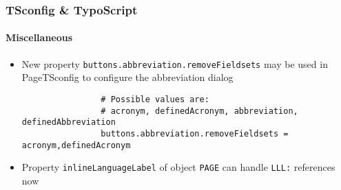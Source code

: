 \begin{frame}[fragile]
	\frametitle{TSconfig \& TypoScript}
	\framesubtitle{Miscellaneous}

	\begin{itemize}
		\item New property \texttt{buttons.abbreviation.removeFieldsets} may be used in
			PageTSconfig to configure the abbreviation dialog

			\begin{lstlisting}
				# Possible values are:
				# acronym, definedAcronym, abbreviation, definedAbbreviation
				buttons.abbreviation.removeFieldsets = acronym,definedAcronym
			\end{lstlisting}

		\item Property \texttt{inlineLanguageLabel} of object \texttt{PAGE} can handle\newline
			\texttt{LLL:} references now

	\end{itemize}

\end{frame}

